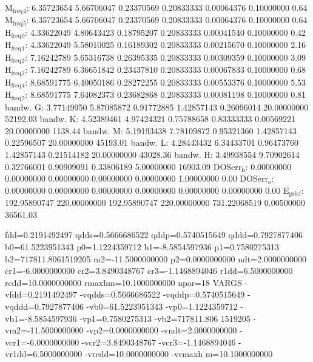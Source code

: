 \documentclass[11pt]{article}
\begin{document}
M\(_{\text{freq}}\)\(_{\text{4}}\):   6.35723654   5.66706047   0.23370569   0.20833333   0.00064376   0.10000000         0.64
M\(_{\text{freq}}\)\(_{\text{5}}\):   6.35723654   5.66706047   0.23370569   0.20833333   0.00064376   0.10000000         0.64
H\(_{\text{freq}}\)\(_{\text{0}}\):   4.33622049   4.80643423   0.18795207   0.20833333   0.00041540   0.10000000         0.42
H\(_{\text{freq}}\)\(_{\text{1}}\):   4.33622049   5.58010025   0.16189302   0.20833333   0.00215670   0.10000000         2.16
H\(_{\text{freq}}\)\(_{\text{2}}\):   7.16242789   5.65316738   0.26395335   0.20833333   0.00309359   0.10000000         3.09
H\(_{\text{freq}}\)\(_{\text{3}}\):   7.16242789   6.36651842   0.23437810   0.20833333   0.00067833   0.10000000         0.68
H\(_{\text{freq}}\)\(_{\text{4}}\):   8.68591775   6.40050186   0.28272255   0.20833333   0.00553376   0.10000000         5.53
H\(_{\text{freq}}\)\(_{\text{5}}\):   8.68591775   7.64082373   0.23682868   0.20833333   0.00081198   0.10000000         0.81
bandw. G:   3.77149950   5.87085872   0.91772885   1.42857143   0.26096014  20.00000000     52192.03
bandw. K:   4.52389461   4.97424321   0.75788658   0.83333333   0.00569221  20.00000000      1138.44
bandw. M:   5.19193438   7.78109872   0.95321360   1.42857143   0.22596507  20.00000000     45193.01
bandw. L:   4.28443432   6.34433701   0.96473760   1.42857143   0.21514182  20.00000000     43028.36
bandw. H:   3.49938554   9.70902614   0.32766001   0.90909091   0.33806189   5.00000000     16903.09
DOSerr\(_{\text{h}}\):   0.00000000   0.00000000   0.00000000   0.00000000   0.00000000   1.00000000         0.00
DOSerr\(_{\text{o}}\):   0.00000000   0.00000000   0.00000000   0.00000000   0.00000000   0.00000000         0.00
E\(_{\text{pris}}\)\(_{\text{f}}\): 192.95890747 220.00000000 192.95890747 220.00000000 731.22068519   0.00500000     36561.03




  fdd=0.2191492497 qdds=0.5666686522 qddp=0.5740515649 qddd=0.7927877406 b0=61.5223951343 p0=1.1224359712 b1=-8.5854597936 p1=0.7580275313 b2=717811.8061519205 m2=-11.5000000000 p2=0.0000000000 ndt=2.0000000000 cr1=-6.0000000000 cr2=3.8490348767 cr3=-1.1468894046 r1dd=6.5000000000 rcdd=10.0000000000 rmaxhm=10.1000000000 npar=18 
VARGS
    -vfdd=0.2191492497 -vqdds=0.5666686522 -vqddp=0.5740515649 -vqddd=0.7927877406 -vb0=61.5223951343 -vp0=1.1224359712 -vb1=-8.5854597936 -vp1=0.7580275313 -vb2=717811.806
1519205 -vm2=-11.5000000000 -vp2=0.0000000000 -vndt=2.0000000000 -vcr1=-6.0000000000 -vcr2=3.8490348767 -vcr3=-1.1468894046 -vr1dd=6.5000000000 -vrcdd=10.0000000000 -vrmaxh
m=10.1000000000 
\end{document}

